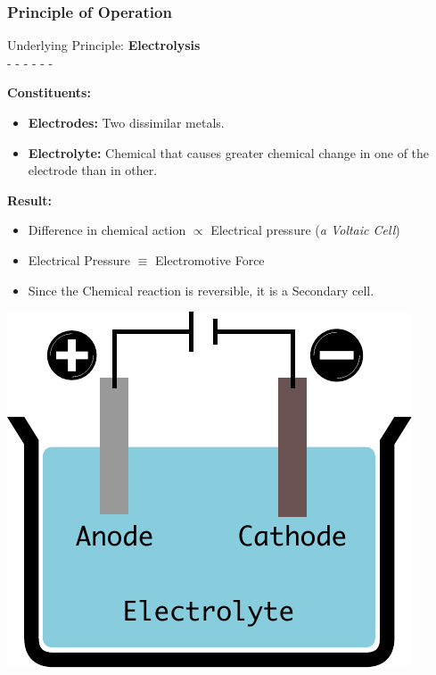 \documentclass{beamer}
\begin{document}
\begin{frame}   %
  \frametitle{Principle of Operation}
  \fontsize{8pt}{10}\selectfont
  \begin{center}
    Underlying Principle: \textbf{Electrolysis} \\
    - - - - - - 
  \end{center}

  \textbf{Constituents:}
  \begin{itemize}
    \item \textbf{Electrodes:} Two dissimilar metals.
    \item \textbf{Electrolyte:} Chemical that causes greater chemical change in one of the electrode than in other.
  \end{itemize}
  
  \bigskip
  \textbf{Result:}
  \begin{itemize}
    \item Difference in chemical action $\propto$ Electrical pressure (\textit{a Voltaic Cell})
    \item Electrical Pressure $\equiv$ Electromotive Force
    \item Since the Chemical reaction is reversible, it is a Secondary cell.
  \end{itemize}
  
  \begin{center}
    \includegraphics[width=0.2\paperwidth]{./Resources/Images/Electrolysis.pdf}  
  \end{center}
  
\end{frame}
\end{document}
